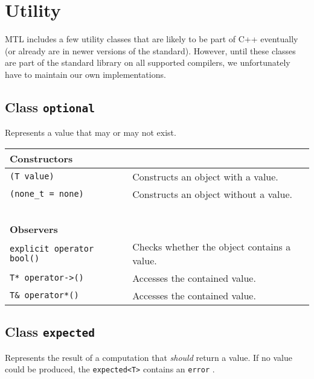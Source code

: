 \section{Utility}
\label{utility}

MTL includes a few utility classes that are likely to be part of C++
eventually (or already are in newer versions of the standard). However, until
these classes are part of the standard library on all supported compilers, we
unfortunately have to maintain our own implementations.

\subsection{Class \lstinline^optional^}
\label{optional}

Represents a value that may or may not exist.

\begin{center}
\begin{tabular}{ll}
  \textbf{Constructors} & ~ \\
  \hline
  \lstinline^(T value)^ & Constructs an object with a value. \\
  \hline
  \lstinline^(none_t = none)^ & Constructs an object without a value. \\
  \hline
  ~ & ~ \\ \textbf{Observers} & ~ \\
  \hline
  \lstinline^explicit operator bool()^ & Checks whether the object contains a value. \\
  \hline
  \lstinline^T* operator->()^ & Accesses the contained value. \\
  \hline
  \lstinline^T& operator*()^ & Accesses the contained value. \\
  \hline
\end{tabular}
\end{center}

\subsection{Class \lstinline^expected^}

Represents the result of a computation that \emph{should} return a value. If no
value could be produced, the \lstinline^expected<T>^ contains an
\lstinline^error^ .


